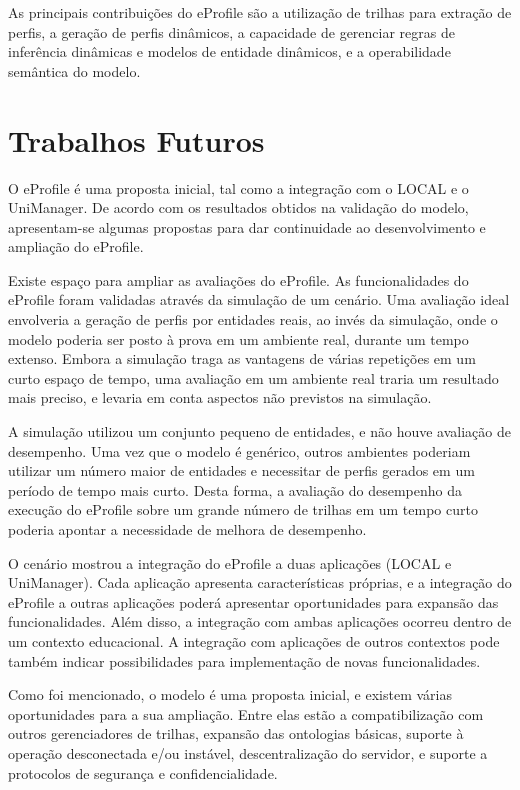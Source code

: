 As principais contribuições do eProfile são a utilização de trilhas para extração de perfis, a geração de perfis dinâmicos, a capacidade de gerenciar regras de inferência dinâmicas e modelos de entidade dinâmicos, e a operabilidade semântica do modelo.


\section{Trabalhos Futuros}

O eProfile é uma proposta inicial, tal como a integração com o LOCAL e o UniManager. De acordo com os resultados obtidos na validação do modelo, apresentam-se algumas propostas para dar continuidade ao desenvolvimento e ampliação do eProfile.

Existe espaço para ampliar as avaliações do eProfile. As funcionalidades do eProfile foram validadas através da simulação de um cenário. Uma avaliação ideal envolveria a geração de perfis por entidades reais, ao invés da simulação, onde o modelo poderia ser posto à prova em um ambiente real, durante um tempo extenso. Embora a simulação traga as vantagens de várias repetições em um curto espaço de tempo, uma avaliação em um ambiente real traria um resultado mais preciso, e levaria em conta aspectos não previstos na simulação.

A simulação utilizou um conjunto pequeno de entidades, e não houve avaliação de desempenho. Uma vez que o modelo é genérico, outros ambientes poderiam utilizar um número maior de entidades e necessitar de perfis gerados em um período de tempo mais curto. Desta forma, a avaliação do desempenho da execução do eProfile sobre um grande número de trilhas em um tempo curto poderia apontar a necessidade de melhora de desempenho.

O cenário mostrou a integração do eProfile a duas aplicações (LOCAL e UniManager). Cada aplicação apresenta características próprias, e a integração do eProfile a outras aplicações poderá apresentar oportunidades para expansão das funcionalidades. Além disso, a integração com ambas aplicações ocorreu dentro de um contexto educacional. A integração com aplicações de outros contextos pode também indicar possibilidades para implementação de novas funcionalidades.

Como foi mencionado, o modelo é uma proposta inicial, e existem várias oportunidades para a sua ampliação. Entre elas estão a compatibilização com outros gerenciadores de trilhas, expansão das ontologias básicas, suporte à operação desconectada e/ou instável, descentralização do servidor, e suporte a protocolos de segurança e confidencialidade.

